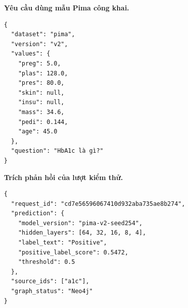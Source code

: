 \noindent\textbf{Yêu cầu dùng mẫu Pima công khai.}\par
\begin{Verbatim}[fontsize=\small]
{
  "dataset": "pima",
  "version": "v2",
  "values": {
    "preg": 5.0,
    "plas": 128.0,
    "pres": 80.0,
    "skin": null,
    "insu": null,
    "mass": 34.6,
    "pedi": 0.144,
    "age": 45.0
  },
  "question": "HbA1c là gì?"
}
\end{Verbatim}
\noindent\textbf{Trích phản hồi của lượt kiểm thử.}\par
\begin{Verbatim}[fontsize=\small]
{
  "request_id": "cd7e56596067410d932aba735ae8b274",
  "prediction": {
    "model_version": "pima-v2-seed254",
    "hidden_layers": [64, 32, 16, 8, 4],
    "label_text": "Positive",
    "positive_label_score": 0.5472,
    "threshold": 0.5
  },
  "source_ids": ["a1c"],
  "graph_status": "Neo4j"
}
\end{Verbatim}
